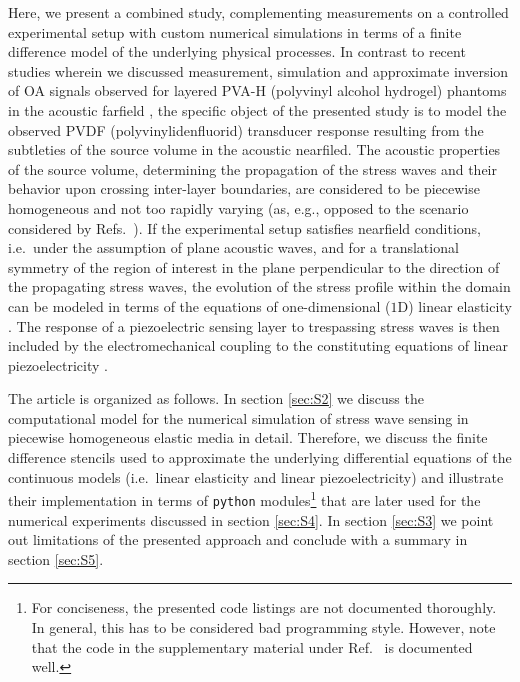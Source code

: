 \documentclass[5p,times,twocolumn]{elsarticle}
\begin{document}
Here, we present a combined study, complementing measurements on a controlled
experimental setup with custom numerical simulations in terms of a finite
difference model of the underlying physical processes.  In contrast to recent
studies wherein we discussed measurement, simulation and approximate inversion
of OA signals observed for layered PVA-H (polyvinyl alcohol hydrogel) phantoms
in the acoustic farfield \cite{Blumenroether:2016,Melchert:2017}, the specific
object of the presented study is to model the observed PVDF
(polyvinylidenfluorid) transducer response resulting from the subtleties of the
source volume in the acoustic nearfiled.  The acoustic properties of the source
volume, determining the propagation of the stress waves and their behavior upon
crossing inter-layer boundaries, are considered to be piecewise homogeneous and
not too rapidly varying (as, e.g., opposed to the scenario considered by Refs.\
\cite{Santosa:1991,Fogarty:1999}).
If the experimental setup satisfies nearfield conditions, i.e.\ under the
assumption of plane acoustic waves, and for a translational symmetry of the
region of interest in the plane perpendicular to the direction of the
propagating stress waves, the evolution of the stress profile within the domain
can be modeled in terms of the equations of one-dimensional ($1$D) linear
elasticity \cite{Landau:1975,Tam:1986,Irgens:2008}. The response of a
piezoelectric sensing layer to trespassing stress waves is then included by the
electromechanical coupling to the constituting equations of linear
piezoelectricity \cite{Szabo:2004}. 


The article is organized as follows. In section \ref{sec:S2} we discuss the
computational model for the numerical simulation of stress wave sensing in
piecewise homogeneous elastic media in detail. Therefore, we discuss the finite
difference stencils used to approximate the underlying differential equations
of the continuous models (i.e.\ linear elasticity and linear piezoelectricity)
and illustrate their implementation in terms of {\tt python}
modules\footnote{For conciseness, the presented code listings are not
documented thoroughly. In general, this has to be considered bad programming
style.  However, note that the code in the supplementary material under Ref.\
\cite{Melchert_gitHub_1DFD:2017} is documented well.} that are later used for
the numerical experiments discussed in section \ref{sec:S4}. In section
\ref{sec:S3} we point out limitations of the presented approach and conclude
with a summary in section \ref{sec:S5}.
 
\end{document}
